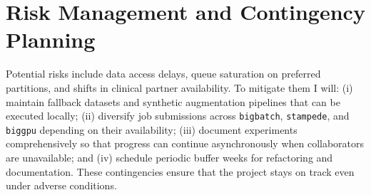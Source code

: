 \section{Risk Management and Contingency Planning}
Potential risks include data access delays, queue saturation on preferred partitions, and shifts in clinical partner availability. To mitigate them I will: (i) maintain fallback datasets and synthetic augmentation pipelines that can be executed locally; (ii) diversify job submissions across \texttt{bigbatch}, \texttt{stampede}, and \texttt{biggpu} depending on their availability; (iii) document experiments comprehensively so that progress can continue asynchronously when collaborators are unavailable; and (iv) schedule periodic buffer weeks for refactoring and documentation. These contingencies ensure that the project stays on track even under adverse conditions.

% 